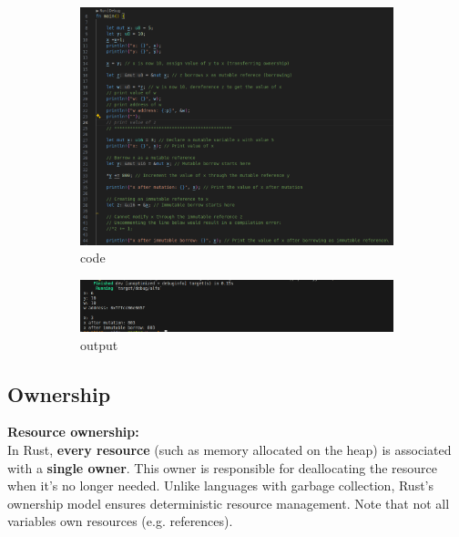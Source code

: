 \documentclass{article}
\begin{document}
\begin{figure}[h!]
    \centering
    \begin{subfigure}{0.70\linewidth}
        \includegraphics[width=\linewidth]{images/code1.png}
        \caption{code}
        \label{fig:code1}
    \end{subfigure}%
    \begin{subfigure}{0.70\linewidth}
        \includegraphics[width=\linewidth]{images/output1.png}
        \caption{output}
        \label{fig:output1}
    \end{subfigure}
    \caption{}
    \label{fig:borrowing_mutable_unmutable_manner}
\end{figure}

\subsection{Ownership}
\textbf{Resource ownership:} \\
In Rust, \textbf{every resource} (such as memory allocated on the heap) is associated with a \textbf{single owner}. This owner is responsible for deallocating the resource when it's no longer needed. Unlike languages with garbage collection, Rust's ownership model ensures deterministic resource management. Note that not all variables own resources (e.g. references).
\end{document}
